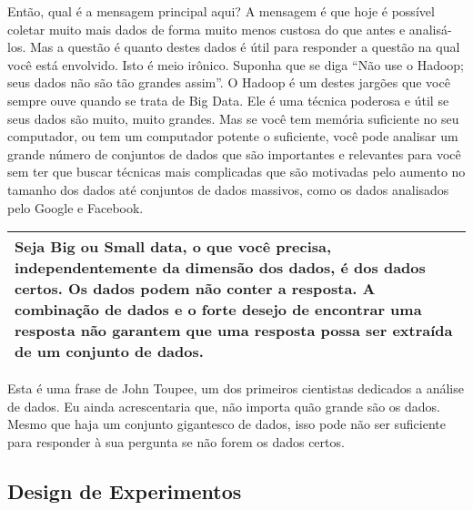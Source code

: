\begin{multicols}{2}
\begin{footnotesize}
Então, qual é a mensagem principal aqui? A mensagem é que hoje é possível coletar muito mais dados de forma muito menos custosa do que antes e analisá-los. Mas a questão é quanto destes dados é útil para responder a questão na qual você está envolvido. Isto é meio irônico. Suponha que se diga ``Não use o Hadoop; seus dados não são tão grandes assim''. O Hadoop é um destes jargões que você sempre ouve quando se trata de Big Data. Ele é uma técnica poderosa e útil se seus dados são muito, muito grandes. Mas se você tem memória suficiente no seu computador, ou tem um computador potente o suficiente, você pode analisar um grande número de conjuntos de dados que são importantes e relevantes para você sem ter que buscar técnicas mais complicadas que são motivadas pelo aumento no tamanho dos dados até conjuntos de dados massivos, como os dados analisados pelo Google e Facebook. 
\end{footnotesize}
\end{multicols}

\begin{center}
\begin{tabular}{p{15cm}}
\hline
Seja Big ou Small data, o que você precisa, independentemente da dimensão dos dados, é dos dados certos. Os dados podem não conter a resposta. A combinação de dados e o forte desejo de encontrar uma resposta não garantem que uma resposta possa ser extraída de um conjunto de dados. \\
\hline
\end{tabular}
\end{center}

\begin{multicols}{2}
\begin{footnotesize}
Esta é uma frase de John Toupee, um dos primeiros cientistas dedicados a análise de dados. Eu ainda acrescentaria que, não importa quão grande são os dados. Mesmo que haja um conjunto gigantesco de dados, isso pode não ser suficiente para responder à sua pergunta se não forem os dados certos. 
\end{footnotesize}
\end{multicols}


\subsection{Design de Experimentos}

